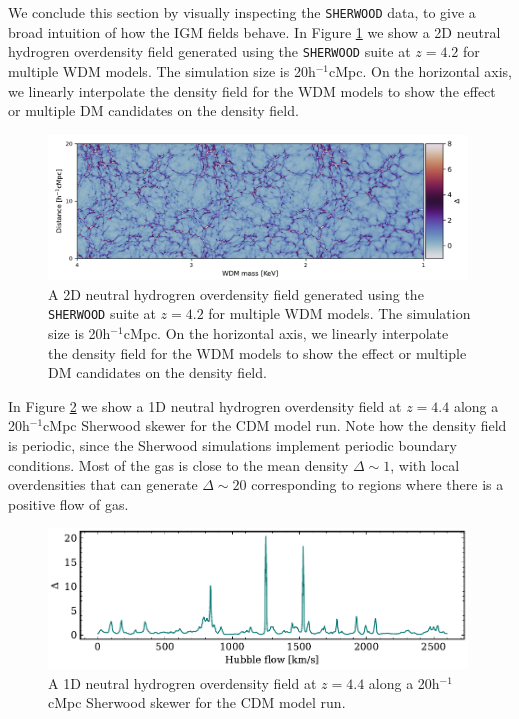 We conclude this section by visually inspecting the \texttt{SHERWOOD} data, to give a broad intuition of how the IGM fields behave. In Figure \ref{fig: 2D density image} we show a 2D neutral hydrogren overdensity field generated using the \texttt{SHERWOOD} suite at $z=4.2$ for multiple WDM models. The simulation size is 20h$^{-1}$cMpc. On the horizontal axis, we linearly interpolate the density field for the WDM models to show the effect or multiple DM candidates on the density field.
\begin{figure}[ht]
        \centering
        \includegraphics[width=0.99\textwidth]{img/ML/density_image_wdm.pdf}
        \caption{A 2D neutral hydrogren overdensity field generated using the \texttt{SHERWOOD} suite at $z=4.2$ for multiple WDM models. The simulation size is 20h$^{-1}$cMpc. On the horizontal axis, we linearly interpolate the density field for the WDM models to show the effect or multiple DM candidates on the density field.}
        \label{fig: 2D density image}     
\end{figure}
In Figure \ref{fig: 1D density skewer} we show a  1D neutral hydrogren overdensity field at $z=4.4$ along a 20h$^{-1}$cMpc Sherwood skewer for the CDM model run. Note how the density field is periodic, since the Sherwood simulations implement periodic boundary conditions. Most of the gas is close to the mean density $\Delta \sim 1$, with local overdensities that can generate $\Delta \sim 20$ corresponding to regions where there is a positive flow of gas.
\begin{figure}
        \centering
        \includegraphics[width=0.99\textwidth]{img/ML/Skewer_density.pdf}
        \caption{A 1D neutral hydrogren overdensity field at $z=4.4$ along a 20h$^{-1}$cMpc Sherwood skewer for the CDM model run.}
        \label{fig: 1D density skewer}     
\end{figure}










